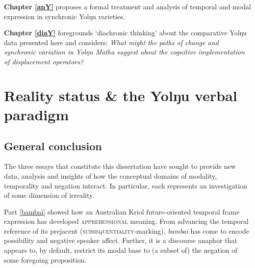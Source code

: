 \documentclass[12pt,dvipsnames]{report}
\newcommand{\mcom}[1]
{\marginpar{\color{black}\raggedleft\raggedright\hspace{0pt}\linespread{0.9}\footnotesize{#1}}}
\begin{document}
		\textbf{Chapter \ref{anY}} proposes a formal treatment and analysis of temporal and modal expression in synchronic Yolŋu varieties.
		
		\textbf{Chapter \ref{diaY} }foregrounds `diachronic thinking' about the comparative Yolŋu data presented here and considers: {\em What might the paths of change and synchronic variation in Yolŋu Matha suggest about the cognitive implementation of displacement operators?}
		\vfill
		
		\upshape 
\fi


\part{Reality status \& the Yolŋu verbal paradigm}\label{yolŋu}
%


%

\chapter*{General conclusion}



The three essays that constitute this dissertation have sought to provide new data, analysis and insights of how the conceptual domains of modality, temporality and negation interact. In particular, each represents an investigation of some dimension of irreality.

Part \ref{bambai} showed how an Australian Kriol future-oriented temporal frame expression has developed \textsc{apprehensional} meaning. From advancing the temporal reference of its prejacent (\textsc{subsequentiality}-marking), \textit{bambai} has come to encode possibility and negative speaker affect. Further, it is a discourse anaphor that appears to, by default, restrict its modal base to (a subset of) the negation of some foregoing proposition.
\end{document}

